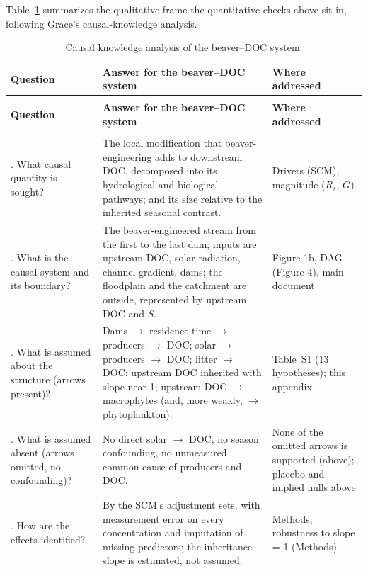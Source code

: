 \documentclass[11pt,a4paper]{article}
\begin{document}
Table~\ref{tab:S2} summarizes the qualitative frame the quantitative checks above sit in, following Grace's causal-knowledge analysis.

\begin{center}
\begin{small}
\begin{longtable}{|>{\raggedright\arraybackslash}p{}|>{\raggedright\arraybackslash}p{}|>{\raggedright\arraybackslash}p{}|}
\caption{Causal knowledge analysis of the beaver--DOC system.}\label{tab:S2}\\
\hline
\textbf{Question} & \textbf{Answer for the beaver--DOC system} & \textbf{Where addressed} \\ \hline
\endfirsthead
\multicolumn{3}{l}{\small\textit{Table S2 (continued)}}\\
\hline
\textbf{Question} & \textbf{Answer for the beaver--DOC system} & \textbf{Where addressed} \\ \hline
\endhead
\multicolumn{3}{r}{\small\textit{continued on next page}}\\
\endfoot
\endlastfoot
1. What causal quantity is sought? & The local modification that beaver-engineering adds to downstream DOC, decomposed into its hydrological and biological pathways; and its size relative to the inherited seasonal contrast. & Drivers (SCM), magnitude ($R_s$, $G$) \\ \hline
2. What is the causal system and its boundary? & The beaver-engineered stream from the first to the last dam; inputs are upstream DOC, solar radiation, channel gradient, dams; the floodplain and the catchment are outside, represented by upstream DOC and $S$. & Figure 1b, DAG (Figure 4), main document \\ \hline
3. What is assumed about the structure (arrows present)? & Dams $\rightarrow$ residence time $\rightarrow$ producers $\rightarrow$ DOC; solar $\rightarrow$ producers $\rightarrow$ DOC; litter $\rightarrow$ DOC; upstream DOC inherited with slope near 1; upstream DOC $\rightarrow$ macrophytes (and, more weakly, $\rightarrow$ phytoplankton). & Table~S1 (13 hypotheses); this appendix \\ \hline
4. What is assumed absent (arrows omitted, no confounding)? & No direct solar $\rightarrow$ DOC, no season confounding, no unmeasured common cause of producers and DOC. & None of the omitted arrows is supported (above); placebo and implied nulls above \\ \hline
5. How are the effects identified? & By the SCM's adjustment sets, with measurement error on every concentration and imputation of missing predictors; the inheritance slope is estimated, not assumed. & Methods; robustness to slope = 1 (Methods) \\ \hline

\end{longtable}
\end{small}
\end{center}
\end{document}
